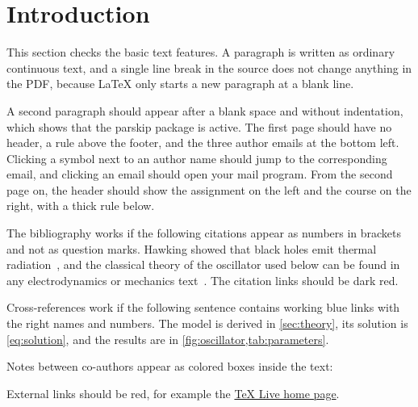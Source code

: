 \section{Introduction}
\label{sec:intro}

This section checks the basic text features. A paragraph is written as ordinary continuous text, and a single line break in the source does not change anything in the PDF,
because LaTeX only starts a new paragraph at a blank line.

A second paragraph should appear after a blank space and without indentation, which shows that the parskip package is active.
The first page should have no header, a rule above the footer, and the three author emails at the bottom left.
Clicking a symbol next to an author name should jump to the corresponding email, and clicking an email should open your mail program.
From the second page on, the header should show the assignment on the left and the course on the right, with a thick rule below.

The bibliography works if the following citations appear as numbers in brackets and not as question marks.
Hawking showed that black holes emit thermal radiation~\cite{hawking1975particle}, and the classical theory of the oscillator used below can be found in any electrodynamics or mechanics text~\cite{jackson1999classical,goldstein2002classical}.
The citation links should be dark red.

Cross-references work if the following sentence contains working blue links with the right names and numbers.
The model is derived in \cref{sec:theory}, its solution is \cref{eq:solution}, and the results are in \cref{fig:oscillator,tab:parameters}.

Notes between co-authors appear as colored boxes inside the text:

External links should be red, for example the \href{https://tug.org/texlive/}{TeX Live home page}.
